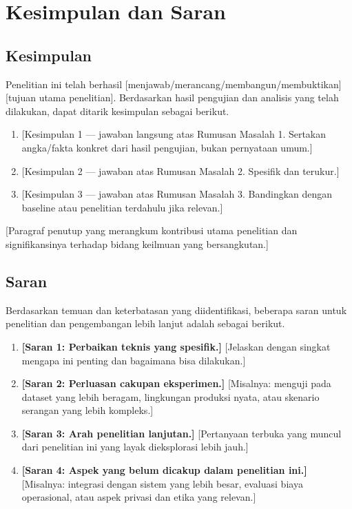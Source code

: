 
\chapter{Kesimpulan dan Saran}

\section{Kesimpulan}
\label{sec:7.1}

Penelitian ini telah berhasil [menjawab/merancang/membangun/membuktikan] [tujuan utama
penelitian]. Berdasarkan hasil pengujian dan analisis yang telah dilakukan, dapat
ditarik kesimpulan sebagai berikut.

\begin{enumerate}
  \item {[Kesimpulan 1 — jawaban langsung atas Rumusan Masalah 1. Sertakan angka/fakta
        konkret dari hasil pengujian, bukan pernyataan umum.]}

  \item {[Kesimpulan 2 — jawaban atas Rumusan Masalah 2. Spesifik dan terukur.]}

  \item {[Kesimpulan 3 — jawaban atas Rumusan Masalah 3. Bandingkan dengan baseline atau
        penelitian terdahulu jika relevan.]}
\end{enumerate}

[Paragraf penutup yang merangkum kontribusi utama penelitian dan signifikansinya terhadap
bidang keilmuan yang bersangkutan.]

\section{Saran}
\label{sec:7.2}

Berdasarkan temuan dan keterbatasan yang diidentifikasi, beberapa saran untuk penelitian
dan pengembangan lebih lanjut adalah sebagai berikut.

\begin{enumerate}
  \item \textbf{[Saran 1: Perbaikan teknis yang spesifik.]}
        [Jelaskan dengan singkat mengapa ini penting dan bagaimana bisa dilakukan.]

  \item \textbf{[Saran 2: Perluasan cakupan eksperimen.]}
        [Misalnya: menguji pada dataset yang lebih beragam, lingkungan produksi nyata,
        atau skenario serangan yang lebih kompleks.]

  \item \textbf{[Saran 3: Arah penelitian lanjutan.]}
        [Pertanyaan terbuka yang muncul dari penelitian ini yang layak dieksplorasi
        lebih jauh.]

  \item \textbf{[Saran 4: Aspek yang belum dicakup dalam penelitian ini.]}
        [Misalnya: integrasi dengan sistem yang lebih besar, evaluasi biaya operasional,
        atau aspek privasi dan etika yang relevan.]
\end{enumerate}
